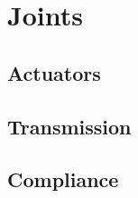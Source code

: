 \section{Joints} %
\label{sec:joints}

  \subsection{Actuators} %
  \label{sub:actuators}


  \subsection{Transmission} %
  \label{sub:transmission}


  \subsection{Compliance} %
  \label{sub:compliance}


